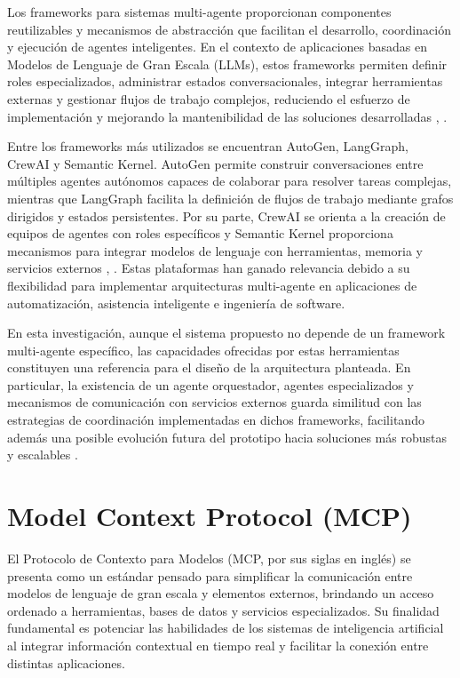 Los frameworks para sistemas multi-agente proporcionan componentes reutilizables y mecanismos de abstracción que facilitan el desarrollo, 
coordinación y ejecución de agentes inteligentes. En el contexto de aplicaciones basadas en Modelos de Lenguaje de Gran Escala (LLMs), estos 
frameworks permiten definir roles especializados, administrar estados conversacionales, integrar herramientas externas y gestionar flujos de 
trabajo complejos, reduciendo el esfuerzo de implementación y mejorando la mantenibilidad de las soluciones desarrolladas \cite{Guo2024}, \cite{xi2025rise}.

Entre los frameworks más utilizados se encuentran AutoGen, LangGraph, CrewAI y Semantic Kernel. AutoGen permite construir conversaciones 
entre múltiples agentes autónomos capaces de colaborar para resolver tareas complejas, mientras que LangGraph facilita la definición de 
flujos de trabajo mediante grafos dirigidos y estados persistentes. Por su parte, CrewAI se orienta a la creación de equipos de agentes 
con roles específicos y Semantic Kernel proporciona mecanismos para integrar modelos de lenguaje con herramientas, memoria y servicios 
externos \cite{xi2025rise}, \cite{wu2023autogen}. Estas plataformas han ganado relevancia debido a su flexibilidad para implementar arquitecturas multi-agente en aplicaciones 
de automatización, asistencia inteligente e ingeniería de software.

En esta investigación, aunque el sistema propuesto no depende de un framework multi-agente específico, las capacidades ofrecidas por estas 
herramientas constituyen una referencia para el diseño de la arquitectura planteada. En particular, la existencia de un agente orquestador, 
agentes especializados y mecanismos de comunicación con servicios externos guarda similitud con las estrategias de coordinación implementadas 
en dichos frameworks, facilitando además una posible evolución futura del prototipo hacia soluciones más robustas y escalables \cite{Guo2024}.



\section{Model Context Protocol (MCP) }

El Protocolo de Contexto para Modelos (MCP, por sus siglas en inglés) se presenta como un estándar pensado para simplificar la comunicación entre 
modelos de lenguaje de gran escala y elementos externos, brindando un acceso ordenado a herramientas, bases de datos y servicios especializados. 
Su finalidad fundamental es potenciar las habilidades de los sistemas de inteligencia artificial al integrar información contextual en tiempo real 
y facilitar la conexión entre distintas aplicaciones.\cite{Anthropic2024}

